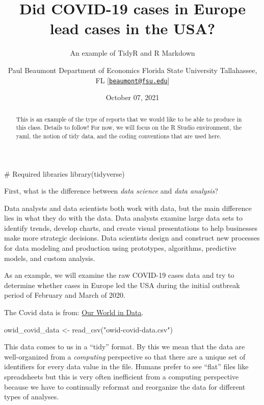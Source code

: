 \documentclass[
]{article}
\title{Did COVID-19 cases in Europe lead cases in the USA?}
\subtitle{An example of TidyR and R Markdown}
\author{Paul Beaumont Department of Economics Florida State University
Tallahassee, FL
{[}\href{mailto:beaumont@fsu.edu}{\nolinkurl{beaumont@fsu.edu}}{]}}
\date{October 07, 2021}
\newenvironment{Shaded}{}{}
\newcommand{\CommentTok}[1]{\textcolor[rgb]{0.00,0.50,0.00}{#1}}
\newcommand{\FunctionTok}[1]{#1}
\newcommand{\NormalTok}[1]{#1}
\newcommand{\OtherTok}[1]{\textcolor[rgb]{1.00,0.25,0.00}{#1}}
\newcommand{\StringTok}[1]{\textcolor[rgb]{0.00,0.50,0.50}{#1}}
\begin{document}
\maketitle
\begin{abstract}
This is an example of the type of reports that we would like to be able
to produce in this class. Details to follow! For now, we will focus on
the R Studio environment, the yaml, the notion of tidy data, and the
coding conventions that are used here.
\end{abstract}

\begin{Shaded}
\begin{Highlighting}[]
\CommentTok{\# Required libraries}
\FunctionTok{library}\NormalTok{(tidyverse)}
\end{Highlighting}
\end{Shaded}

First, what is the difference between \emph{data science} and \emph{data
analysis}?

Data analysts and data scientists both work with data, but the main
difference lies in what they do with the data. Data analysts examine
large data sets to identify trends, develop charts, and create visual
presentations to help businesses make more strategic decisions. Data
scientists design and construct new processes for data modeling and
production using prototypes, algorithms, predictive models, and custom
analysis.

As an example, we will examine the raw COVID-19 cases data and try to
determine whether cases in Europe led the USA during the initial
outbreak period of February and March of 2020.

The Covid data is from:
\href{https://ourworldindata.org/explorers/coronavirus-data-explorer?time=earliest..2020-04-13\&facet=none\&Metric=Confirmed+cases\&Interval=7-day+rolling+average\&Relative+to+Population=false\&Align+outbreaks=false\&country=USA~Europe~European+Union}{Our
World in Data}.

\begin{Shaded}
\begin{Highlighting}[]
\NormalTok{owid\_covid\_data }\OtherTok{\textless{}{-}} \FunctionTok{read\_csv}\NormalTok{(}\StringTok{"owid{-}covid{-}data.csv"}\NormalTok{)}
\end{Highlighting}
\end{Shaded}

This data comes to us in a ``tidy'' format. By this we mean that the
data are well-organized from a \emph{computing} perspective so that
there are a unique set of identifiers for every data value in the file.
Humans prefer to see ``flat'' files like spreadsheets but this is very
often inefficient from a computing perspective because we have to
continually reformat and reorganize the data for different types of
analyses.
\end{document}
